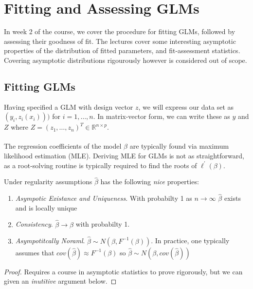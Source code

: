 
\section{Fitting and Assessing GLMs}
In week 2 of the course, we cover the procedure for fitting GLMs, followed by assessing their goodness of fit. The lectures cover some interesting asymptotic properties of the distribution of fitted parameters, and fit-assessment statistics. Covering asymptotic distributions rigourously however is considered out of scope.

\subsection{Fitting GLMs}
Having specified a GLM with design vector $z$, we will express our data set as $(y_i, z_i(x_i)))$ for $i=1,\dots,n$. In matrix-vector form, we can write these as $y$ and $Z$ where $Z = (z_1, \dots, z_n)^T\in\mathbb{R}^{n\times p}$. \\
\\
The regression coefficients of the model $\beta$ are typically found via maximum likelihood estimation (MLE). Deriving MLE for GLMs is not as straightforward, as a root-solving routine is typically required to find the roots of $\ell^\prime(\beta)$.

\begin{definition}
    
\end{definition}

\begin{theorem}
    Under regularity assumptions $\hat{\beta}$ has the following \textit{nice} properties:\begin{enumerate}
        \item \textit{Asympotic Existance and Uniqueness}. With probabilty 1 as $n\rightarrow\infty$ $\hat{\beta}$ exists and is locally unique
        \item \textit{Consistency}. $\hat{\beta}\rightarrow\beta$ with probabilty 1. 
        \item \textit{Asympotitcally Noraml}. $\hat{\beta}\sim N(\beta, F^{-1}(\beta))$. In practice, one typically assumes that $cov(\hat{\beta}) \approx F^{-1}(\beta)$ so $\hat{\beta}\sim N(\beta, cov(\hat{\beta}))$
    \end{enumerate}
\end{theorem}
\begin{proof}
    Requires a course in asymptotic statistics to prove rigorously, but we can given an \textit{inutitive} argument below.
\end{proof}

